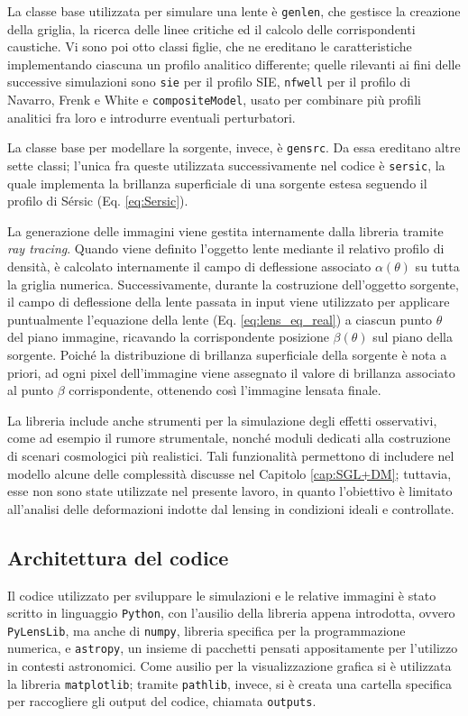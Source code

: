 La classe base utilizzata per simulare una lente è \texttt{genlen}, che gestisce la creazione della griglia, la ricerca delle linee critiche ed il calcolo delle corrispondenti caustiche. Vi sono poi otto classi figlie, che ne ereditano le caratteristiche implementando ciascuna un profilo analitico differente; quelle rilevanti ai fini delle successive simulazioni sono \texttt{sie} per il profilo SIE, \texttt{nfwell} per il profilo di Navarro, Frenk e White e \texttt{compositeModel}, usato per combinare più profili analitici fra loro e introdurre eventuali perturbatori.

La classe base per modellare la sorgente, invece, è \texttt{gensrc}. Da essa ereditano altre sette classi; l'unica fra queste utilizzata successivamente nel codice è \texttt{sersic}, la quale implementa la brillanza superficiale di una sorgente estesa seguendo il profilo di Sérsic (Eq. \ref{eq:Sersic}).

La generazione delle immagini viene gestita internamente dalla libreria tramite \emph{ray tracing}.
Quando viene definito l'oggetto lente mediante il relativo profilo di densità, è calcolato internamente il campo di deflessione associato $\alpha(\theta)$ su tutta la griglia numerica. Successivamente, durante la costruzione dell'oggetto sorgente, il campo di deflessione della lente passata in input viene utilizzato per applicare puntualmente l'equazione della lente (Eq. \ref{eq:lens_eq_real}) a ciascun punto $\theta$ del piano immagine, ricavando la corrispondente posizione $\beta(\theta)$ sul piano della sorgente. Poiché la distribuzione di brillanza superficiale della sorgente è nota a priori, ad ogni pixel dell'immagine viene assegnato il valore di brillanza associato al punto $\beta$ corrispondente, ottenendo così l'immagine lensata finale.

La libreria include anche strumenti per la simulazione degli effetti osservativi, come ad esempio il rumore strumentale, nonché moduli dedicati alla costruzione di scenari cosmologici più realistici. Tali funzionalità permettono di includere nel modello alcune delle complessità discusse nel Capitolo \ref{cap:SGL+DM}; tuttavia, esse non sono state utilizzate nel presente lavoro, in quanto l'obiettivo è limitato all'analisi delle deformazioni indotte dal lensing in condizioni ideali e controllate.

\subsection{Architettura del codice}
Il codice utilizzato per sviluppare le simulazioni e le relative immagini è stato scritto in linguaggio \texttt{Python}, con l'ausilio della libreria appena introdotta, ovvero \texttt{PyLensLib}, ma anche di \texttt{numpy}, libreria specifica per la programmazione numerica, e \texttt{astropy}, un insieme di pacchetti pensati appositamente per l'utilizzo in contesti astronomici. Come ausilio per la visualizzazione grafica si è utilizzata la libreria \texttt{matplotlib}; tramite \texttt{pathlib}, invece, si è creata una cartella specifica per raccogliere gli output del codice, chiamata \texttt{outputs}.

